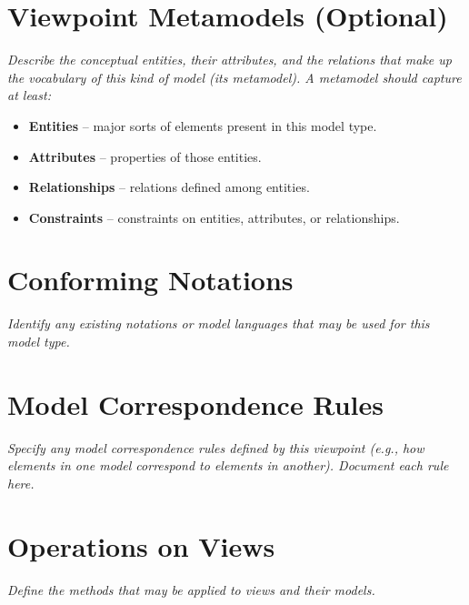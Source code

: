 \documentclass[11pt]{article}
\begin{document}
\vspace{4em}

\section*{Viewpoint Metamodels (Optional)}
\textit{Describe the conceptual entities, their attributes, and the relations
that make up the vocabulary of this kind of model (its metamodel). A metamodel
should capture at least:}
\begin{itemize}[nosep]
  \item \textbf{Entities} – major sorts of elements present in this model type.
  \item \textbf{Attributes} – properties of those entities.
  \item \textbf{Relationships} – relations defined among entities.
  \item \textbf{Constraints} – constraints on entities, attributes, or
        relationships.
\end{itemize}

\vspace{4em}

\section*{Conforming Notations}
\textit{Identify any existing notations or model languages that may be used for
this model type.}

\vspace{4em}

\section*{Model Correspondence Rules}
\textit{Specify any model correspondence rules defined by this viewpoint (e.g.,
how elements in one model correspond to elements in another). Document each
rule here.}

\vspace{6em}

\section*{Operations on Views}
\textit{Define the methods that may be applied to views and their models.}
\end{document}

